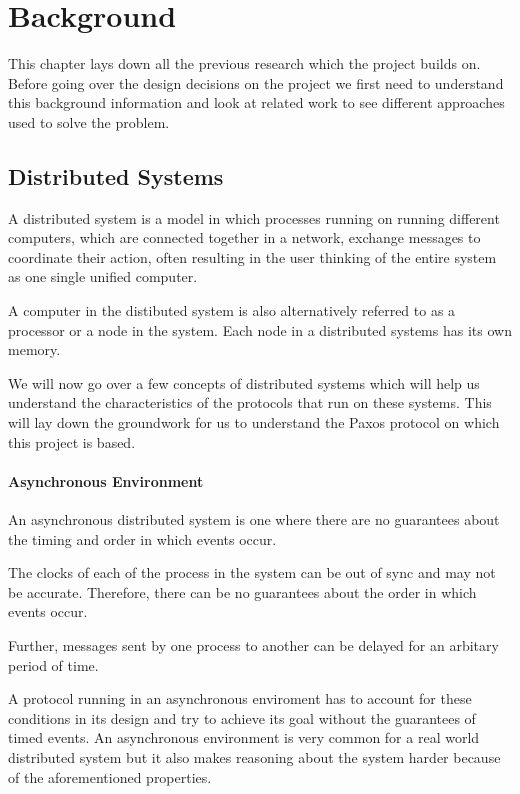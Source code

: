 \chapter{Background}
This chapter lays down all the previous research which the project builds on. Before
going over the design decisions on the project we first need to understand this
background information and look at related work to see different approaches used
to solve the problem.

\section{Distributed Systems}

A distributed system is a model in which processes running on running different
computers, which are connected together in a network, exchange messages to coordinate
their action, often resulting in the user thinking of the entire system as one single
unified computer.

A computer in the distibuted system is also alternatively referred to as a
processor or a node in the system. Each node in a distributed systems has its
own memory.


We will now go over a few concepts of distributed systems which will help us understand
the characteristics of the protocols that run on these systems. This will lay down the
groundwork for us to understand the Paxos protocol on which this project is based.

\subsubsection{Asynchronous Environment}
An asynchronous distributed system is one where there are no guarantees about the
timing and order in which events occur.

The clocks of each of the process in the system can be out of sync and may not be
accurate. Therefore, there can be no guarantees about the order in which events occur.

Further, messages sent by one process to another can be delayed for an arbitary period of time.

A protocol running in an asynchronous enviroment has to account for these conditions
in its design and try to achieve its goal without the guarantees of timed events.
An asynchronous environment is very common for a real world distributed system but
it also makes reasoning about the system harder because of the aforementioned properties.

